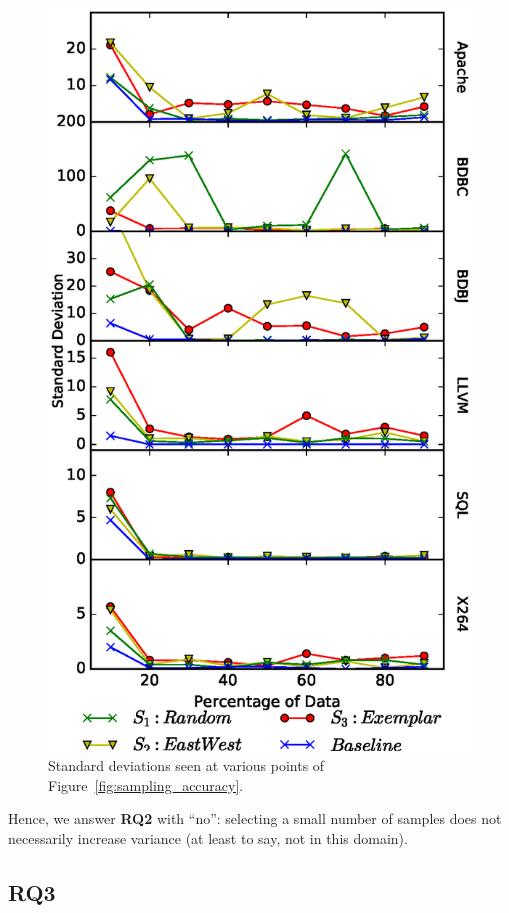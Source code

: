 \documentclass{newsig}
\newcommand{\fig}[1]{Figure~\ref{fig:#1}}
\begin{document}
\begin{figure}[!t]
\includegraphics[width=0.9\linewidth]{Figures/Variance.eps}
\caption{Standard deviations seen at various points of  \fig{sampling_accuracy}.}\label{fig:Variance}
\end{figure}

\begin{myshadowbox}
Hence, we answer {\bf RQ2} with ``no'': selecting a small number of samples does not necessarily increase variance (at least to say, not in this domain).
\end{myshadowbox}




\subsection{RQ3}
\end{document}
